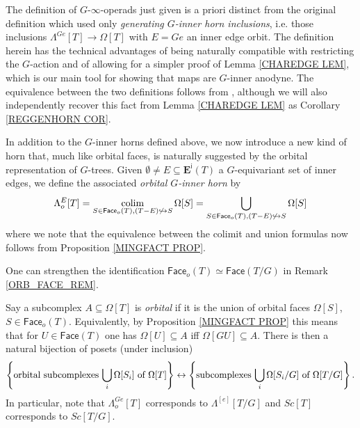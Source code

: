 \documentclass[a4paper,10pt
 ,draft
]{article}%
\begin{document}
\begin{remark}
The definition of $G$-$\infty$-operads just given is a priori distinct from the original definition \cite[Def. 6.12]{Per18} which used only 
\textit{generating $G$-inner horn inclusions}, i.e. 
those inclusions $\Lambda^{Ge}[T] \to \Omega[T]$ with $E=Ge$ an inner edge orbit.
The definition herein has the technical advantages of being naturally compatible with restricting the $G$-action and of allowing for a simpler proof of Lemma \ref{CHAREDGE LEM}, 
which is our main tool for showing that maps
are $G$-inner anodyne.
The equivalence between the two definitions follows from 
\cite[Prop. 6.17]{Per18},
although we will also independently recover this fact
from Lemma \ref{CHAREDGE LEM} as Corollary \ref{REGGENHORN COR}.
\end{remark}


In addition to the $G$-inner horns defined above, we now introduce a new kind of horn that, much like orbital faces,
is naturally suggested by the orbital representation of $G$-trees.
Given $\emptyset \neq E \subseteq \boldsymbol{E}^{\mathsf{i}}(T)$ a $G$-equivariant set of inner edges, we define the associated 
\textit{orbital $G$-inner horn} by
\[
	\Lambda^{E}_o[T] = 
	\mathop{\operatorname{colim}}_{S \in 
	\mathsf{Face}_o(T),
	(T - E) \not \hookrightarrow S}
	\Omega[S] =
	\bigcup_{S \in 
	\mathsf{Face}_o(T),
	(T - E) \not \hookrightarrow S}
	\Omega[S]
\]
where we note that the equivalence between the colimit and union formulas now follows from Proposition \ref{MINGFACT PROP}.


\begin{remark}\label{ORB_HORN_REM}
One can strengthen the identification 
$\mathsf{Face}_o(T) \simeq \mathsf{Face}(T/G)$
in Remark \ref{ORB_FACE_REM}.

Say a subcomplex $A \subseteq \Omega[T]$ is \textit{orbital}
if it is the union of orbital faces $\Omega[S]$, $S\in \mathsf{Face}_o(T)$. 
Equivalently, by Proposition \ref{MINGFACT PROP} this means that for $U \in \mathsf{Face}(T)$
one has $\Omega[U] \subseteq A$ iff $\Omega[GU] \subseteq A$. There is then a natural bijection 
of posets (under inclusion)
\begin{equation}
	\left\{
	\text{orbital subcomplexes $\bigcup_i\Omega[S_i]$ of $\Omega[T]$}\right\}
		\leftrightarrow
	\left\{\text{subcomplexes $\bigcup_i\Omega[S_i/G]$ of $\Omega[T/G]$}\right\}.
\end{equation}
In particular, note that $\Lambda^{Ge}_o[T]$ corresponds to $\Lambda^{[e]}[T/G]$
and $Sc[T]$ corresponds to $Sc[T/G]$.
\end{remark}
\end{document}
